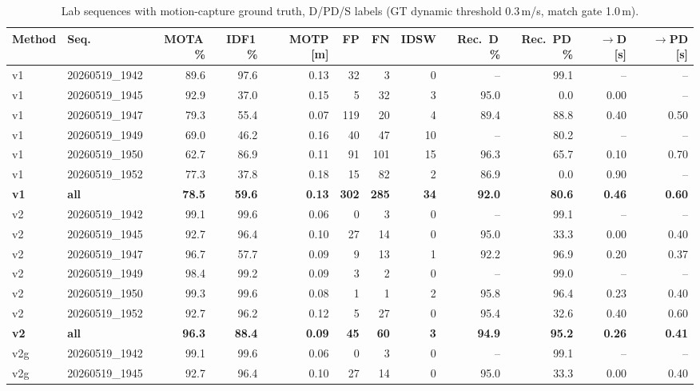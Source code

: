 \begin{table}[t]
\centering
\caption{Lab sequences with motion-capture ground truth, D/PD/S labels (GT dynamic threshold 0.3\,m/s, match gate 1.0\,m).}
\label{tab:own_r8b_full}
\setlength{\tabcolsep}{3pt}
\begin{tabular}{llrrrrrrrrrr}
\toprule
Method & Seq. & MOTA\,\% & IDF1\,\% & MOTP [m] & FP & FN & IDSW & Rec.\ D\,\% & Rec.\ PD\,\% & $\to$D [s] & $\to$PD [s] \\
\midrule
v1 & 20260519\_1942 & 89.6 & 97.6 & 0.13 & 32 & 3 & 0 & -- & 99.1 & -- & -- \\
v1 & 20260519\_1945 & 92.9 & 37.0 & 0.15 & 5 & 32 & 3 & 95.0 & 0.0 & 0.00 & -- \\
v1 & 20260519\_1947 & 79.3 & 55.4 & 0.07 & 119 & 20 & 4 & 89.4 & 88.8 & 0.40 & 0.50 \\
v1 & 20260519\_1949 & 69.0 & 46.2 & 0.16 & 40 & 47 & 10 & -- & 80.2 & -- & -- \\
v1 & 20260519\_1950 & 62.7 & 86.9 & 0.11 & 91 & 101 & 15 & 96.3 & 65.7 & 0.10 & 0.70 \\
v1 & 20260519\_1952 & 77.3 & 37.8 & 0.18 & 15 & 82 & 2 & 86.9 & 0.0 & 0.90 & -- \\
\textbf{v1} & \textbf{all} & \textbf{78.5} & \textbf{59.6} & \textbf{0.13} & \textbf{302} & \textbf{285} & \textbf{34} & \textbf{92.0} & \textbf{80.6} & \textbf{0.46} & \textbf{0.60} \\
\midrule
v2 & 20260519\_1942 & 99.1 & 99.6 & 0.06 & 0 & 3 & 0 & -- & 99.1 & -- & -- \\
v2 & 20260519\_1945 & 92.7 & 96.4 & 0.10 & 27 & 14 & 0 & 95.0 & 33.3 & 0.00 & 0.40 \\
v2 & 20260519\_1947 & 96.7 & 57.7 & 0.09 & 9 & 13 & 1 & 92.2 & 96.9 & 0.20 & 0.37 \\
v2 & 20260519\_1949 & 98.4 & 99.2 & 0.09 & 3 & 2 & 0 & -- & 99.0 & -- & -- \\
v2 & 20260519\_1950 & 99.3 & 99.6 & 0.08 & 1 & 1 & 2 & 95.8 & 96.4 & 0.23 & 0.40 \\
v2 & 20260519\_1952 & 92.7 & 96.2 & 0.12 & 5 & 27 & 0 & 95.4 & 32.6 & 0.40 & 0.60 \\
\textbf{v2} & \textbf{all} & \textbf{96.3} & \textbf{88.4} & \textbf{0.09} & \textbf{45} & \textbf{60} & \textbf{3} & \textbf{94.9} & \textbf{95.2} & \textbf{0.26} & \textbf{0.41} \\
\midrule
v2g & 20260519\_1942 & 99.1 & 99.6 & 0.06 & 0 & 3 & 0 & -- & 99.1 & -- & -- \\
v2g & 20260519\_1945 & 92.7 & 96.4 & 0.10 & 27 & 14 & 0 & 95.0 & 33.3 & 0.00 & 0.40 \\

\end{tabular}
\end{table}
